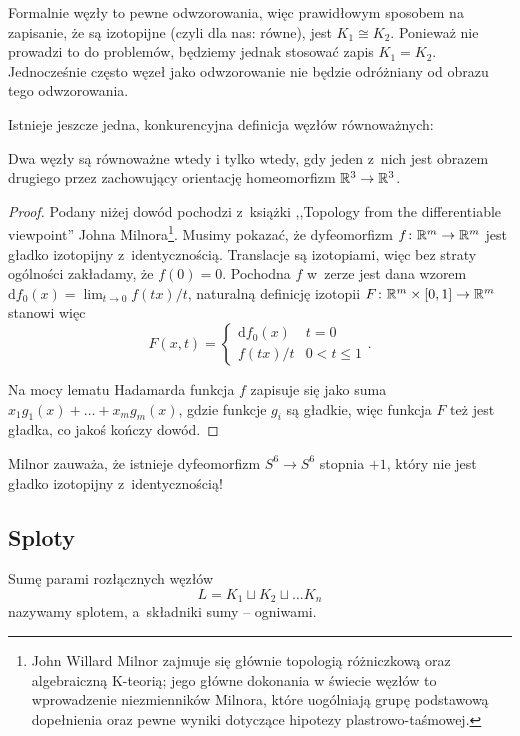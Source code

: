 Formalnie węzły to pewne odwzorowania, więc prawidłowym sposobem na zapisanie, że są izotopijne (czyli dla nas: równe), jest $K_1 \cong K_2$.
Ponieważ nie prowadzi to do problemów, będziemy jednak stosować zapis $K_1 = K_2$.
Jednocześnie często węzeł jako odwzorowanie nie będzie odróżniany od obrazu tego odwzorowania.

Istnieje jeszcze jedna, konkurencyjna definicja węzłów równoważnych:

\begin{proposition}
\label{def:equivalent_knots_2}%
    Dwa węzły są równoważne wtedy i tylko wtedy, gdy jeden z~nich jest obrazem drugiego przez zachowujący orientację homeomorfizm $\mathbb R^3 \to \mathbb R^3$.
\end{proposition}

\begin{proof}
%
    Podany niżej dowód pochodzi z~książki ,,Topology from the differentiable viewpoint'' Johna Milnora\footnote{John Willard Milnor zajmuje się głównie topologią różniczkową oraz algebraiczną K-teorią; jego główne dokonania w świecie węzłów to wprowadzenie niezmienników Milnora, które uogólniają grupę podstawową dopełnienia oraz pewne wyniki dotyczące hipotezy plastrowo-taśmowej.}.
%
    Musimy pokazać, że dyfeomorfizm $f \colon \mathbb R^m \to \mathbb R^m$ jest gładko izotopijny z~identycznością.
    Translacje są izotopiami, więc bez straty ogólności zakładamy, że $f(0) = 0$.
    Pochodna $f$ w~zerze jest dana wzorem $\mathrm{d}f_0(x) = \lim_{t \to 0} f(tx) /t$,
    naturalną definicję izotopii $F \colon \mathbb R^m \times [0, 1] \to \mathbb R^m$ stanowi więc
    \begin{equation}
        F(x, t) = \begin{cases}
            \mathrm{d}f_0(x) & t = 0 \\
            f(tx) / t & 0 < t \le 1
        \end{cases} .
    \end{equation}

    Na mocy lematu Hadamarda funkcja $f$ zapisuje się jako suma $x_1 g_1(x) + \ldots + x_mg_m(x)$, gdzie funkcje $g_i$ są gładkie, więc funkcja $F$ też jest gładka, co jakoś kończy dowód.
\end{proof}

Milnor zauważa, że istnieje dyfeomorfizm $S^6 \to S^6$ stopnia $+1$, który nie jest gładko izotopijny z~identycznością!

\subsection{Sploty}
\begin{definition}
%
    Sumę parami rozłącznych węzłów
    \begin{equation}
        L = K_1 \sqcup K_2 \sqcup \ldots K_n
    \end{equation}
    nazywamy splotem, a~składniki sumy -- ogniwami.
\end{definition}

